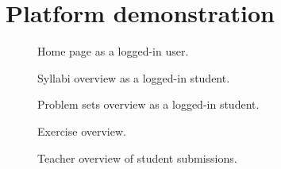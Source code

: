 \chapter{Platform demonstration} \label{chap:images}
\begin{figure}[H]
    \centering
    \caption{Home page as a logged-in user.}
    \label{fig:Home page}
\end{figure}

\begin{figure}[H]
    \centering
    \caption{Syllabi overview as a logged-in student.}
    \label{fig:syllabi}
\end{figure}

\begin{figure}[H]
    \centering
    \caption{Problem sets overview as a logged-in student.}
    \label{fig:problemsets}
\end{figure}

\begin{figure}[H]
    \centering
    \caption{Exercise overview.}
    \label{fig:exercise_overview}
\end{figure}

\begin{figure}[H]
    \centering
    \caption{Teacher overview of student submissions.}
    \label{fig:teacher_overview.}
\end{figure}